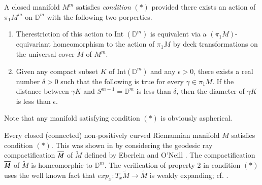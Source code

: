 \begin{defi}\label{c6:defi6.3}
  A closed manifold $M^{m}$ satisfies \textit{condition} $(*)$
  provided there exists an action of $\pi_1 M^m$ on $\mathbb{D}^m$
  with the following two porperties.
  \begin{enumerate}
    \item The\pageoriginale restriction of this action to Int $(\mathbb{D}^m)$ is
      equivalent via a $(\pi_1 M)$-equivariant homeomorphism to the
      action of $\pi_1 M$ by deck transformations on the universal
      cover $\tilde{M}$ of $M^m$.
      \item Given any compact subset $K$ of Int$(\mathbb{D}^m)$ and
        any $\epsilon > 0$, there exists a real number $\delta> 0$
        such that the following is true for every $\gamma \in \pi_1
        M$. If the distance between $\gamma K$ and
        $S^{m-1}=\mathbb{D}^m$ is less than $\delta$, then the
        diameter of $\gamma K$ is less than $\epsilon$.
  \end{enumerate}
  Note that any manifold satisfying condition $(*)$ is obviously aspherical.
\end{defi}

\begin{remark*}
  Every closed (connected) non-positively curved Riemannian manifold
  $M$ satisfies condition $(*)$. This was shown in \cite{30} by
  considering the geodesic ray compactification $\overline{M}$ of
  $\tilde{M}$ defined by Eberlein and O'Neill \cite{26}. The
  compactification $\overline{M}$ of $\tilde{M}$ is homeomorphic to
  $\mathbb{D}^m$. The verification of property 2 in condition $(*)$
  uses the well known fact that $exp_x : T_x \tilde{M} \to \tilde{M}$
  is weakly expanding; cf. \cite[p. 172, Lemma 1]{59}.
\end{remark*}

